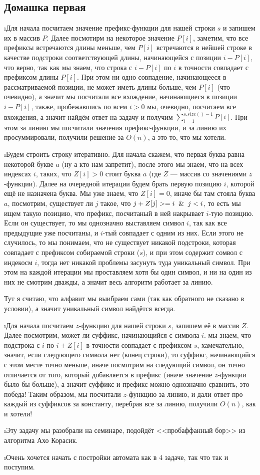 \subsection{Домашка первая}

\i Для начала посчитаем значение префикс-функции для нашей строки $s$ и запишем их в массив $P$. Далее посмотирм на некоторое значение $P[i]$, заметим, что все префиксы 
встречаются длины меньше, чем $P[i]$ встречаются в нейшей строке в качестве подстроки соответствующей длины, начинающейся с позиции $i - P[i]$, что верно,
так как мы знаем, что строка с $i - P[i]$ по $i$ в точности совпадает с префиксом длины $P[i]$. При этом ни одно совпадение, начинающееся в рассматриваемой 
позиции, не может иметь длины больше, чем $P[i]$ (что очевидно), а значит мы посчитали все вхождение, начинающиеся в позиции $i - P[i]$, также, пробежавшись по всем $i > 0$ 
мы, очевидно, посчитаем все вхождения, а значит найдём ответ на задачу и получим $\sum_{i=1}^{s.size()-1} P[i]$. При этом за линию мы посчитали значения
префикс-функции, и за линию их просуммировали, получили решение за $O(n)$, а это то, что мы хотели.

\i Будем строить строку итеративно. Для начала скажем, что первая буква равна некоторой букве $a$ (ну а кто нам запретит), после этого мы знаем, что на всех
индексах $i$, таких, что $Z[i] > 0$ стоит буква $a$ (где $Z$ --- массив со значениями $z$-функции). Далее на очередной итерации будем брать первую позицию
$i$, которой ещё не назначена буква. Мы уже знаем, что $Z[i] = 0$, иначе бы там стояла буква $a$, посмотрим, существует ли $j$ такое, что $j + Z[j] >= i \And 
j < i$, то есть мы ищем такую позицию, что префикс, посчитаный в ней накрывает $i$-тую позицию. Если он существует, то мы однозначно выставляем символ $i$, 
так как все предыдущие уже посчитаны, и $i$-тый совпадает с одним из них. Если этого не случилось, то мы понимаем, что не существует никакой подстроки, 
которая совпадает с префиксом собираемой строки ($s$), и при этом содержит сомвол с индекосм $i$, тогда нет никакой проблемы засунуть туда уникальный символ.
При этом на каждой итерации мы проставляем хотя бы один символ, и ни на один из них не смотрим дважды, а значит весь алгоритм работает за линию.
\begin{remark*}
    Тут я считаю, что алфавит мы выибраем сами (так как обратного не сказано в условии), а значит уникальный символ найдётся всегда.
\end{remark*}

\i Для начала посчитаем $z$-функцию для нашей строки $s$, запишем её в массив $Z$. Далее посмотрим, может ли суффикс, начинающийся с символа $i$. мы знаем, что
подстрока с $i$ по $i + Z[i]$ в точности совпадает с префиксом $s$, хамечательно, значит, если следующего символа нет (конец строки), то суффикс, начинающийся 
с этом месте точно меньше, иначе посмотрим на следующий символ, он точно отличается от того, который добавляется в префикс (иначе значение $z$-функции было бы 
больше), а значит суффикс и префикс можно однозначно сравнить, это победа! Таким образом, мы посчитали $z$-функцию за линию, и дали ответ про каждый из суффиксов
за константу, перебрав все за линию, получили $O(n)$, как и хотели!

\i Эту задачу мы разобрали на семинаре, подойдёт <<пробаффанный бор>> из алгоритма Ахо Корасик. 

\i Очень хочется начать с постройки автомата как в 4 задаче, так что так и поступим.
